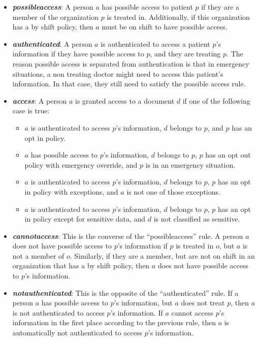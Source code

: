 \documentclass[conference]{IEEEtran}
\begin{document}
\begin{itemize}
 \item \textbf{\textit{possibleaccess}}: A person $a$ has possible access to patient $p$ if they are a member of the organization $p$ is treated in.
Additionally, if this organization has a by shift policy, then $a$ must be on shift to have possible access.
\item \textbf{\textit{authenticated}}: A person $a$ is authenticated to access a patient $p$'s information if they have possible access to $p$, and they are
treating $p$. The reason possible access is separated from authentication is that in emergency situations, a non treating doctor might need to access this
patient's information. In that case, they still need to satisfy the possible access rule.
\item \textbf{\textit{access}}: A person $a$ is granted access to a document $d$ if one of the following case is true:
\begin{itemize}
 \item $a$ is authenticated to access $p$'s information, $d$ belongs to $p$, and $p$ has an opt in policy.
\item $a$ has possible access to $p$'s information, $d$ belongs to $p$, $p$ has an opt out policy with emergency override, and $p$ is in an emergency situation.
\item $a$ is authenticated to access $p$'s information, $d$ belongs to $p$, $p$ has an opt in policy with exceptions, and $a$ is not one of those exceptions.
\item $a$ is authenticated to access $p$'s information, $d$ belongs to $p$, $p$ has an opt in policy except for sensitive data, and $d$ is not classified as
sensitive.
\end{itemize}
\item \textbf{\textit{cannotaccess}}: This is the converse of the ``possibleaccess'' rule. A person $a$ does not have possible access to $p$'s information if $p$
is treated in $o$, but $a$ is not a member of $o$. Similarly, if they are a member, but are not on shift in an organization that has a by shift policy, then $a$
does not have possible access to $p$'s information.
\item \textbf{\textit{notauthenticated}}: This is the opposite of the ``authenticated'' rule. If a person $a$ has possible access to $p$'s information, but
$a$
does not treat $p$, then $a$ is not authenticated to access $p$'s information. If $a$ cannot access $p$'s information in the first place according to the
previous rule, then $a$ is automatically not authenticated to access $p$'s information.

\end{itemize}
\end{document}

